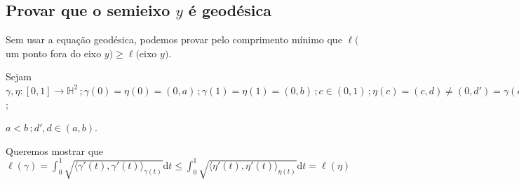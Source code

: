 \documentclass[10pt,a4paper]{article}
\begin{document}
		\subsection{Provar que o semieixo $y$ \'e geod\'esica}
		\begin{flushright}
		\end{flushright}

		Sem usar a equa\c{c}\~ao geod\'esica, podemos provar pelo comprimento m\'inimo que $\ell($um ponto fora do eixo $y) \ge \ell($eixo $y).$

		Sejam $\gamma, \eta: [0, 1] \rightarrow \mathbb{H}^2 \,; \gamma(0) = \eta(0) = (0, a) \,; \gamma(1) = \eta(1) = (0, b) \,; c \in (0, 1) \,; \eta(c) = (c, d) \ne (0, d') = \gamma(c)$;

		$a < b \,; d', d \in (a, b)$.

		Queremos mostrar que $\ell(\gamma) = \int_0^1 \sqrt{ \langle \gamma'(t), \gamma'(t) \rangle_{\gamma(t)} } \textrm{d}t \le \int_0^1 \sqrt{ \langle \eta'(t), \eta'(t) \rangle_{\eta(t)} } \textrm{d}t = \ell(\eta)$
\end{document}
